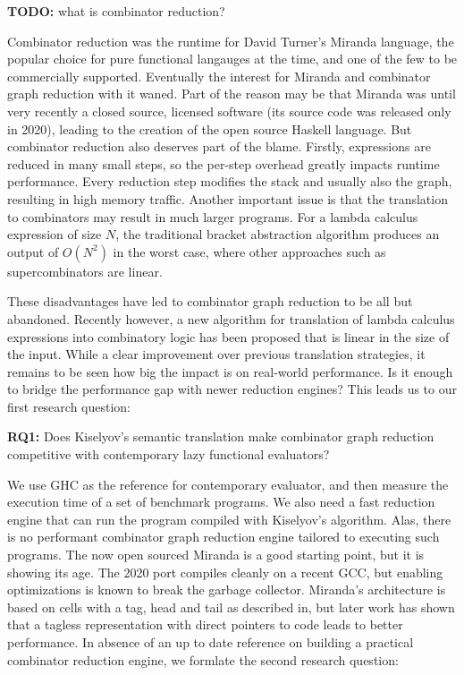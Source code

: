 \documentclass[conference]{IEEEtran}
\begin{document}
\textbf{TODO:} what is combinator reduction?

Combinator reduction was the runtime for David Turner's Miranda language\cite{turner_miranda_1985}, the popular choice for pure functional langauges at the time, and one of the few to be commercially supported.
Eventually the interest for Miranda and combinator graph reduction with it waned.
Part of the reason may be that Miranda was until very recently a closed source, licensed software (its source code was released only in 2020\cite{noauthor_open_2021}), leading to the creation of the open source Haskell language.
But combinator reduction also deserves part of the blame.
Firstly, expressions are reduced in many small steps, so the per-step overhead greatly impacts runtime performance.
Every reduction step modifies the stack and usually also the graph, resulting in high memory traffic.
Another important issue is that the translation to combinators may result in much larger programs.
For a lambda calculus expression of size $N$, the traditional bracket abstraction algorithm produces an output of $O(N^2)$ in the worst case, where other approaches such as supercombinators are linear\cite{spj_impl}.

These disadvantages have led to combinator graph reduction to be all but abandoned.
Recently however, a new algorithm for translation of lambda calculus expressions into combinatory logic has been proposed that is linear in the size of the input\cite{kiselyov_lambda_2018}.
While a clear improvement over previous translation strategies, it remains to be seen how big the impact is on real-world performance.
Is it enough to bridge the performance gap with newer reduction engines?
This leads us to our first research question:

\textbf{RQ1:} Does Kiselyov's semantic translation make combinator graph reduction competitive with contemporary lazy functional evaluators?

We use GHC as the reference for contemporary evaluator, and then measure the execution time of a set of benchmark programs.
We also need a fast reduction engine that can run the program compiled with Kiselyov's algorithm.
Alas, there is no performant combinator graph reduction engine tailored to executing such programs.
The now open sourced Miranda is a good starting point, but it is showing its age.
The 2020 port compiles cleanly on a recent GCC, but enabling optimizations is known to break the garbage collector.
Miranda's architecture is based on cells with a tag, head and tail as described in\cite{turner_new_1979}, but later work has shown that a tagless representation with direct pointers to code leads to better performance\cite{koopman_fresh_1989}.
In absence of an up to date reference on building a practical combinator reduction engine, we formlate the second research question:
\end{document}
